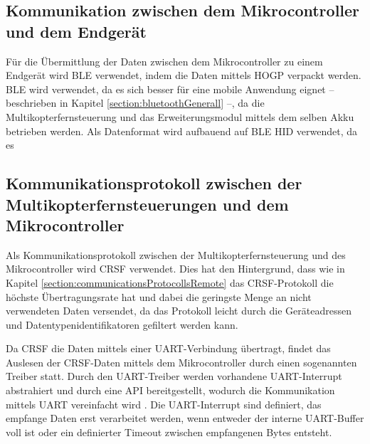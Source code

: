 \subsection{Kommunikation zwischen dem Mikrocontroller und dem Endgerät}
Für die Übermittlung der Daten zwischen dem Mikrocontroller zu einem Endgerät wird \ac{BLE} verwendet, indem die Daten mittels \ac{HOGP} verpackt werden. \ac{BLE} wird verwendet, da es sich besser für eine mobile Anwendung eignet -- beschrieben in Kapitel \ref{section:bluetoothGenerall} --, da die Multikopterfernsteuerung und das Erweiterungsmodul mittels dem selben Akku betrieben werden. Als Datenformat wird aufbauend auf \ac{BLE} \ac{HID} verwendet, da es 

\subsection{Kommunikationsprotokoll zwischen der Multikopterfernsteuerungen und dem Mikrocontroller}
Als Kommunikationsprotokoll zwischen der Multikopterfernsteuerung und des Mikrocontroller wird CRSF verwendet. Dies hat den Hintergrund, dass wie in Kapitel \ref{section:communicationsProtocollsRemote} das CRSF-Protokoll die höchste Übertragungsrate hat und dabei die geringste Menge an nicht verwendeten Daten versendet, da das Protokoll leicht durch die Geräteadressen und Datentypenidentifikatoren gefiltert werden kann.

Da CRSF die Daten mittels einer \ac{UART}-Verbindung übertragt, findet das Auslesen der CRSF-Daten mittels dem Mikrocontroller durch einen sogenannten Treiber statt. Durch den \ac{UART}-Treiber werden vorhandene \ac{UART}-Interrupt abstrahiert und durch eine \ac{API} bereitgestellt, wodurch die Kommunikation mittels \ac{UART} vereinfacht wird \cite{espUARTDriver}. Die \ac{UART}-Interrupt sind definiert, das empfange Daten erst verarbeitet werden, wenn entweder der interne \ac{UART}-Buffer voll ist oder ein definierter Timeout zwischen empfangenen Bytes entsteht.

